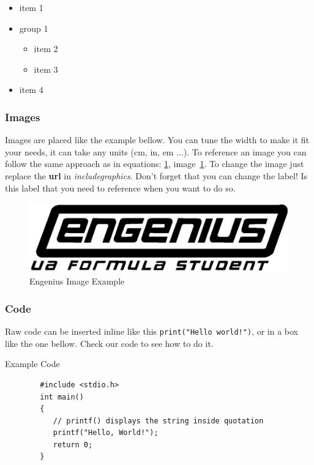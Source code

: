 \documentclass[]{engenius}
\begin{document}
\begin{itemize}
    \item item 1
    \item group 1
    \begin{itemize}
        \item item 2
        \item item 3
    \end{itemize}
    \item item 4
\end{itemize}


\subsubsection{Images}

Images are placed like the example bellow. You can tune the width to make it fit your needs, it can take any units (cm, in, em ...). To reference an image you can follow the same approach as in equations: \texttt{\ref{img:engeniuslogo}}, image~\ref{img:engeniuslogo}.
To change the image just replace the \textbf{url} in \textit{includegraphics}. Don't forget that you can change the label! Is this label that you need to reference when you want to do so.

\begin{figure}[H]
    \begin{center}
        \includegraphics[width=\textwidth/3]{src/engeniusLogo.png}
        \caption{Engenius Image Example}
        \label{img:engeniuslogo}
    \end{center}
\end{figure}

\subsubsection{Code}

Raw code can be inserted inline like this \texttt{print("Hello world!")}, or in a box like the one bellow. Check our code to see how to do it.

\begin{codebox}{Example Code}
    \begin{verbatim}
        #include <stdio.h>
        int main()
        {
           // printf() displays the string inside quotation
           printf("Hello, World!");
           return 0;
        }
    \end{verbatim}
\end{codebox}
\end{document}
